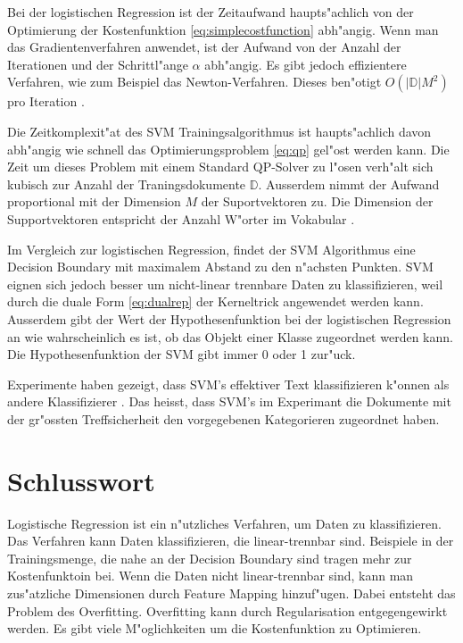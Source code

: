 \documentclass[12pt,a4paper,twoside]{article}
\begin{document}
Bei der logistischen Regression ist der Zeitaufwand haupts"achlich von der Optimierung der Kostenfunktion \ref{eq:simplecostfunction} abh"angig. Wenn man das Gradientenverfahren anwendet, ist der Aufwand von der Anzahl der Iterationen und der Schrittl"ange $\alpha$ abh"angig. Es gibt jedoch effizientere Verfahren, wie zum Beispiel das Newton-Verfahren. Dieses ben"otigt $O(|\mathbb{D}| M^2)$ pro Iteration \cite{minka03}.

Die Zeitkomplexit"at des SVM Trainingsalgorithmus ist haupts"achlich davon abh"angig wie schnell das Optimierungsproblem \ref{eq:qp} gel"ost werden kann. Die Zeit um dieses Problem mit einem Standard QP-Solver zu l"osen verh"alt sich kubisch zur Anzahl der Traningsdokumente $\mathbb{D}$. Ausserdem nimmt der Aufwand proportional mit der Dimension $M$ der Suportvektoren zu. Die Dimension der Supportvektoren entspricht der Anzahl W"orter im Vokabular \cite{manning08}. 

Im Vergleich zur logistischen Regression, findet der SVM Algorithmus eine Decision Boundary mit maximalem Abstand zu den n"achsten Punkten. SVM eignen sich jedoch besser um nicht-linear trennbare Daten zu klassifizieren, weil durch die duale Form \ref{eq:dualrep} der Kerneltrick angewendet werden kann. Ausserdem gibt der Wert der Hypothesenfunktion bei der logistischen Regression an wie wahrscheinlich es ist, ob das Objekt einer Klasse zugeordnet werden kann. Die Hypothesenfunktion der SVM gibt immer 0 oder 1 zur"uck.

Experimente haben gezeigt, dass SVM's effektiver Text klassifizieren k"onnen als andere Klassifizierer \cite{manning08}. Das heisst, dass SVM's im Experimant die Dokumente mit der gr"ossten Treffsicherheit den vorgegebenen Kategorieren zugeordnet haben.

\section{Schlusswort}
\label{sec:conclusion}
Logistische Regression ist ein n"utzliches Verfahren, um Daten zu klassifizieren. Das Verfahren kann Daten klassifizieren, die linear-trennbar sind. Beispiele in der Trainingsmenge, die nahe an der Decision Boundary sind tragen mehr zur Kostenfunktoin bei. Wenn die Daten nicht linear-trennbar sind, kann man zus"atzliche Dimensionen durch Feature Mapping hinzuf"ugen. Dabei entsteht das Problem des Overfitting. Overfitting kann durch Regularisation entgegengewirkt werden. Es gibt viele M"oglichkeiten um die Kostenfunktion zu Optimieren.
\end{document}
